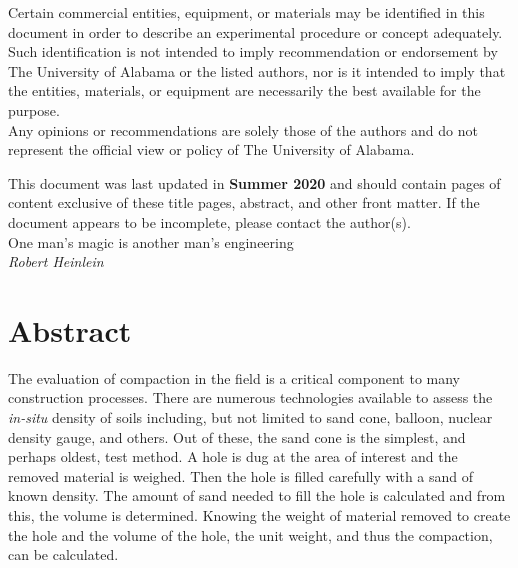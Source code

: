 \documentclass[12pt]{article}
\newcommand{\LastUpdate}{Summer 2020}
\begin{document}
\begin{titlepage}
\begin{center}
\normalsize 
Certain commercial entities, equipment, or materials may be identified in this document in order to describe an experimental procedure or concept adequately. Such identification is not intended to imply recommendation or endorsement by The University of Alabama or the listed authors, nor is it intended to imply that the entities, materials, or equipment are necessarily the best available for the purpose.\\

\vfill
Any opinions or recommendations are solely those of the authors and do not represent the official view or policy of The University of Alabama.
\end{center}
\begin{flushright}
\vfill
\normalsize 
This document was last updated in \textbf{\LastUpdate} and should contain \textbf{\pageref{LastPage}} pages of content exclusive of these title pages, abstract, and other front matter. If the document appears to be incomplete, please contact the author(s).\\
\vfill
One man’s magic is another man’s engineering\\
\textit{Robert Heinlein}
\end{flushright}
\end{titlepage}
\section*{Abstract}
\normalsize The evaluation of compaction in the field is a critical component to many construction processes. There are numerous technologies available to assess the \textit{in-situ} density of soils including, but not limited to sand cone, balloon, nuclear density gauge, and others. Out of these, the sand cone is the simplest, and perhaps oldest, test method. A hole is dug at the area of interest and the removed material is weighed. Then the hole is filled carefully with a sand of known density. The amount of sand needed to fill the hole is calculated and from this, the volume is determined. Knowing the weight of material removed to create the hole and the volume of the hole, the unit weight, and thus the compaction, can be calculated.\\
\end{document}
